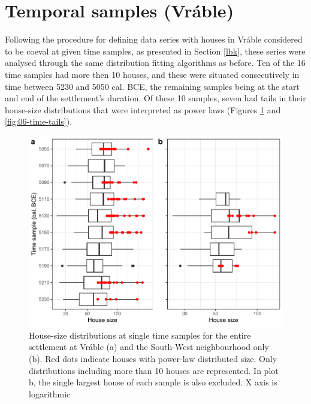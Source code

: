 \documentclass[
  12pt,
  a4paper, twoside]{book}
\begin{document}
\FloatBarrier

\hypertarget{temporal-samples-vruxe1ble}{%
\section{Temporal samples (Vráble)}\label{temporal-samples-vruxe1ble}}

Following the procedure for defining data series with houses in Vráble considered to be coeval at given time samples, as presented in Section \ref{lbk}, these series were analysed through the same distribution fitting algorithms as before. Ten of the 16 time samples had more then 10 houses, and these were situated consecutively in time between 5230 and 5050 cal. BCE, the remaining samples being at the start and end of the settlement's duration. Of these 10 samples, seven had tails in their house-size distributions that were interpreted as power laws (Figures \ref{fig:06-time-box} and \ref{fig:06-time-tails}).



\begin{figure}

{\centering \includegraphics[width=0.9\linewidth]{bookdown-demo_files/figure-latex/06-time-box-1} 

}

\caption[House sizes at Vráble by time sample]{House-size distributions at single time samples for the entire settlement at Vráble (a) and the South-West neighbourhood only (b). Red dots indicate houses with power-law distributed size. Only distributions including more than 10 houses are represented. In plot b, the single largest house of each sample is also excluded. X axis is logarithmic}\label{fig:06-time-box}
\end{figure}
\end{document}
